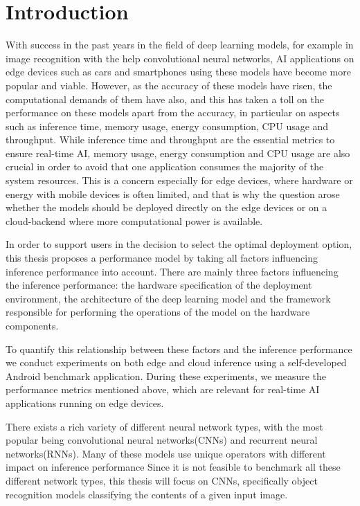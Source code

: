 \chapter{Introduction}



With success in the past years in the field of deep learning models, for example in image recognition with the help convolutional neural networks, AI applications on edge devices such as cars and smartphones using these models have become more popular and viable.
However, as the accuracy of these models have risen, the computational demands of them have also, and this has taken a toll on the performance on these models apart from the accuracy, in particular on aspects such as inference time, memory usage, energy consumption, CPU usage and throughput. 
While inference time and throughput are the essential metrics to ensure real-time AI, memory usage, energy consumption and CPU usage are also crucial in order to avoid that one application consumes the majority of the system resources.
This is a concern especially for edge devices, where hardware or energy with mobile devices is often limited, and that is why the question arose whether the models should be deployed directly on the edge devices or on a cloud-backend where more computational power is available. 


In order to support users in the decision to select the optimal deployment option, this thesis proposes a performance model by taking all factors influencing inference performance into account.
There are mainly three factors influencing the inference performance: the hardware specification of the deployment environment, the architecture of the deep learning model and the framework responsible for performing the operations of the model on the hardware components.

To quantify this relationship between these factors and the inference performance we conduct experiments on both edge and cloud inference using a self-developed Android benchmark application.
During these experiments, we measure the performance metrics mentioned above, which are relevant for real-time AI applications running on edge devices.

There exists a rich variety of different neural network types, with the most popular being convolutional neural networks(CNNs) and recurrent neural networks(RNNs).
Many of these models use unique operators with different impact on inference performance
Since it is not feasible to benchmark all these different network types, this thesis will focus on CNNs, specifically object recognition models classifying the contents of a given input image.





